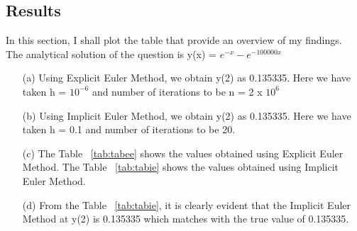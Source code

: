 \documentclass[titlepage, 11pt]{article}
\begin{document}
\subsection{Results}


In this section, I shall plot the table that provide an overview of my findings.\\
The analytical solution of the question is y(x) = $e^{-x}-e^{-100000x}$

\begin{itemize}
    \item [(a)] Using Explicit Euler Method, we obtain y(2) as 0.135335. Here we have taken h = $10^{-6}$ and number of iterations to be n = 2 x $10^{6}$
    \item [(b)] Using Implicit Euler Method, we obtain y(2) as 0.135335. Here we have taken h = 0.1 and number of iterations to be 20. 
    \item [(c)] The Table ~\ref{tab:tabee} shows the values obtained using Explicit Euler Method. The Table ~\ref{tab:tabie} shows the values obtained using Implicit Euler Method.
    \item [(d)] From the Table ~\ref{tab:tabie}, it is clearly evident that the Implicit Euler Method at y(2) is 0.135335 which matches with the true value of 0.135335. 
    

\end{itemize}
\end{document}
